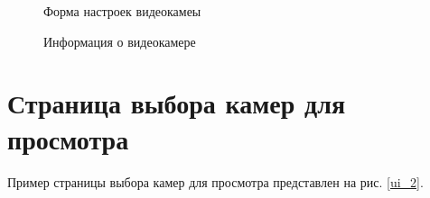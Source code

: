 \newpage

\begin{figure}[!htb]
\def\svgwidth{\columnwidth}
\caption{Форма настроек видеокамеы}
\label{ui_4}
\end{figure}

\begin{figure}[!htb]
\def\svgwidth{\columnwidth}
\caption{Информация о видеокамере}
\label{ui_5}
\end{figure}

\newpage

\section{Страница выбора камер для просмотра}
Пример страницы выбора камер для просмотра представлен на рис. \ref{ui_2}.

